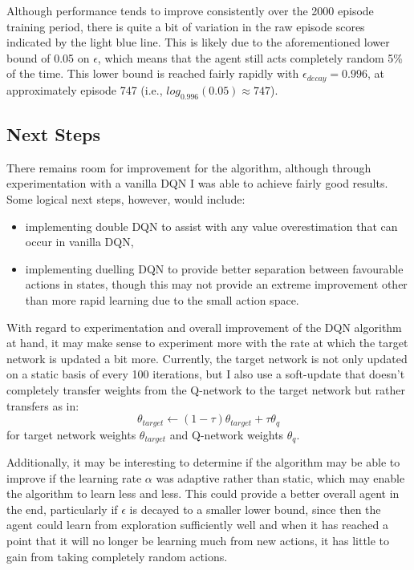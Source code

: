 \documentclass[11pt]{article}
\begin{document}
Although performance tends to improve consistently over the 2000 episode training period, there is quite a bit of variation in the raw episode scores indicated by the light blue line. This is likely due to the aforementioned lower bound of 0.05 on $\epsilon$, which means that the agent still acts completely random 5\% of the time. This lower bound is reached fairly rapidly with $\epsilon_{decay}=0.996$, at approximately episode 747 (i.e., $log_{0.996}(0.05) \approx 747$).

\subsection{Next Steps}

There remains room for improvement for the algorithm, although through experimentation with a vanilla DQN I was able to achieve fairly good results. Some logical next steps, however, would include:
\begin{itemize}
\item implementing double DQN to assist with any value overestimation that can occur in vanilla DQN,
\item implementing duelling DQN to provide better separation between favourable actions in states, though this may not provide an extreme improvement other than more rapid learning due to the small action space.
\end{itemize}

With regard to experimentation and overall improvement of the DQN algorithm at hand, it may make sense to experiment more with the rate at which the target network is updated a bit more. Currently, the target network is not only updated on a static basis of every 100 iterations, but I also use a soft-update that doesn't completely transfer weights from the Q-network to the target network but rather transfers as in:
\begin{equation}
	\theta_{target} \leftarrow (1 - \tau)\theta_{target} + \tau\theta_{q}
\end{equation}
for target network weights $\theta_{target}$ and Q-network weights $\theta_{q}$.

Additionally, it may be interesting to determine if the algorithm may be able to improve if the learning rate $\alpha$ was adaptive rather than static, which may enable the algorithm to learn less and less. This could provide a better overall agent in the end, particularly if $\epsilon$ is decayed to a smaller lower bound, since then the agent could learn from exploration sufficiently well and when it has reached a point that it will no longer be learning much from new actions, it has little to gain from taking completely random actions.
\end{document}
